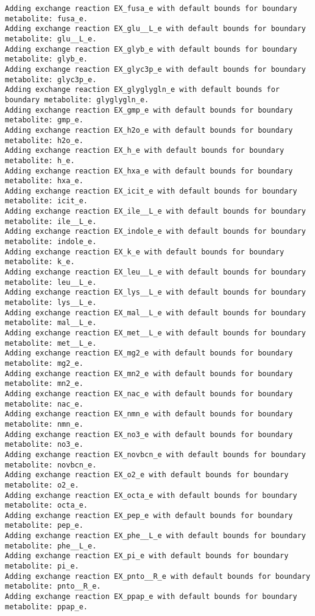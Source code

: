 \documentclass[
  letterpaper,
  DIV=11,
  numbers=noendperiod]{scrartcl}
\begin{document}
\begin{verbatim}
Adding exchange reaction EX_fusa_e with default bounds for boundary metabolite: fusa_e.
Adding exchange reaction EX_glu__L_e with default bounds for boundary metabolite: glu__L_e.
Adding exchange reaction EX_glyb_e with default bounds for boundary metabolite: glyb_e.
Adding exchange reaction EX_glyc3p_e with default bounds for boundary metabolite: glyc3p_e.
Adding exchange reaction EX_glyglygln_e with default bounds for boundary metabolite: glyglygln_e.
Adding exchange reaction EX_gmp_e with default bounds for boundary metabolite: gmp_e.
Adding exchange reaction EX_h2o_e with default bounds for boundary metabolite: h2o_e.
Adding exchange reaction EX_h_e with default bounds for boundary metabolite: h_e.
Adding exchange reaction EX_hxa_e with default bounds for boundary metabolite: hxa_e.
Adding exchange reaction EX_icit_e with default bounds for boundary metabolite: icit_e.
Adding exchange reaction EX_ile__L_e with default bounds for boundary metabolite: ile__L_e.
Adding exchange reaction EX_indole_e with default bounds for boundary metabolite: indole_e.
Adding exchange reaction EX_k_e with default bounds for boundary metabolite: k_e.
Adding exchange reaction EX_leu__L_e with default bounds for boundary metabolite: leu__L_e.
Adding exchange reaction EX_lys__L_e with default bounds for boundary metabolite: lys__L_e.
Adding exchange reaction EX_mal__L_e with default bounds for boundary metabolite: mal__L_e.
Adding exchange reaction EX_met__L_e with default bounds for boundary metabolite: met__L_e.
Adding exchange reaction EX_mg2_e with default bounds for boundary metabolite: mg2_e.
Adding exchange reaction EX_mn2_e with default bounds for boundary metabolite: mn2_e.
Adding exchange reaction EX_nac_e with default bounds for boundary metabolite: nac_e.
Adding exchange reaction EX_nmn_e with default bounds for boundary metabolite: nmn_e.
Adding exchange reaction EX_no3_e with default bounds for boundary metabolite: no3_e.
Adding exchange reaction EX_novbcn_e with default bounds for boundary metabolite: novbcn_e.
Adding exchange reaction EX_o2_e with default bounds for boundary metabolite: o2_e.
Adding exchange reaction EX_octa_e with default bounds for boundary metabolite: octa_e.
Adding exchange reaction EX_pep_e with default bounds for boundary metabolite: pep_e.
Adding exchange reaction EX_phe__L_e with default bounds for boundary metabolite: phe__L_e.
Adding exchange reaction EX_pi_e with default bounds for boundary metabolite: pi_e.
Adding exchange reaction EX_pnto__R_e with default bounds for boundary metabolite: pnto__R_e.
Adding exchange reaction EX_ppap_e with default bounds for boundary metabolite: ppap_e.

\end{verbatim}
\end{document}
